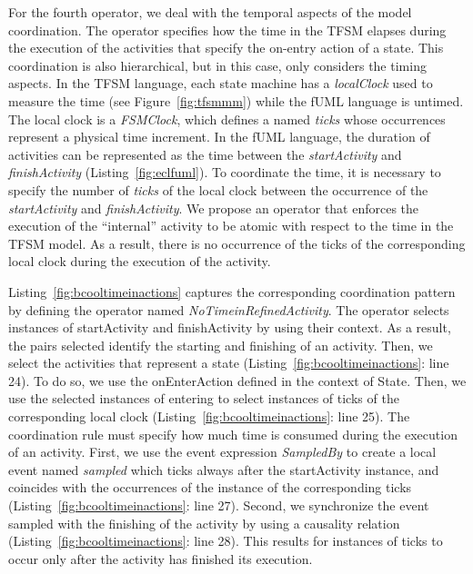 	For the fourth operator, we deal with the temporal aspects of the model coordination. The operator specifies how the time in the TFSM elapses during the execution of the activities that specify the on-entry action of a state. This coordination is also hierarchical, but in this case, only considers the timing aspects. In the TFSM language, each state machine has a \emph{localClock} used to measure the time (see Figure~\ref{fig:tfsmmm}) while the fUML language is untimed. The local clock is a \emph{FSMClock}, which defines a \dse named \emph{ticks} whose occurrences represent a physical time increment. In the fUML language, the duration of activities can be represented as the time between the \dse \emph{startActivity} and \dse \emph{finishActivity} (Listing~\ref{fig:eclfuml}). To coordinate the time, it is necessary to specify the number of \emph{ticks} of the local clock between the occurrence of the \dse \emph{startActivity} and \emph{finishActivity}. We propose an operator that enforces the execution of the ``internal'' activity to be atomic with respect to the time in the TFSM model. As a result, there is no occurrence of the \dse ticks of the corresponding local clock during the execution of the activity. 
	
	Listing~\ref{fig:bcooltimeinactions} captures the corresponding coordination pattern by defining the operator named \emph{NoTimeinRefinedActivity}. The operator selects instances of \dse startActivity and finishActivity by using their context. As a result, the pairs selected identify the starting and finishing of an activity. Then, we select the activities that represent a state (Listing~\ref{fig:bcooltimeinactions}: line 24). To do so, we use the onEnterAction defined in the context of State. Then, we use the selected instances of \dse entering to select instances of \dse ticks of the corresponding local clock (Listing~\ref{fig:bcooltimeinactions}: line 25). The coordination rule must specify how much time is consumed during the execution of an activity. First, we use the event expression \emph{SampledBy} to create a local event named \emph{sampled} which ticks always after the startActivity instance, and coincides with the occurrences of the instance of the corresponding \dse ticks (Listing~\ref{fig:bcooltimeinactions}: line 27). Second, we synchronize the event sampled with the finishing of the activity by using a causality relation (Listing~\ref{fig:bcooltimeinactions}: line 28). This results for instances of ticks to occur only after the activity has finished its execution.
	
